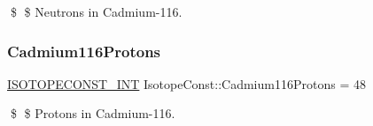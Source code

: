 \$ \$ Neutrons in Cadmium-\/116. \mbox{\label{group___isotope_const-_cadmium-_cd116_ga6f231a8a9b732dc2e8c36a53f1b8a3ff}} 
\subsubsection{\texorpdfstring{Cadmium116\+Protons}{Cadmium116Protons}}
{\footnotesize\ttfamily \mbox{\hyperlink{group___isotope_const-_macros_ga5f18360b3e99483a35c32d789e62621c}{I\+S\+O\+T\+O\+P\+E\+C\+O\+N\+S\+T\+\_\+\+I\+NT}} Isotope\+Const\+::\+Cadmium116\+Protons = 48}

\$ \$ Protons in Cadmium-\/116. 
